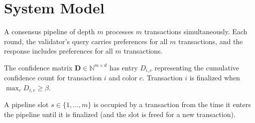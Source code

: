 \section{System Model}

\label{sec:model}

\begin{definition}[Pipeline]
A consensus pipeline of depth $m$ processes $m$ transactions simultaneously. Each
round, the validator's query carries preferences for all $m$ transactions, and the
response includes preferences for all $m$ transactions.
\end{definition}

\begin{definition}
The confidence matrix $\mathbf{D} \in \mathbb{N}^{m \times d}$ has entry $D_{i,c}$
representing the cumulative confidence count for transaction $i$ and color $c$.
Transaction $i$ is finalized when $\max_c D_{i,c} \geq \beta$.
\end{definition}

\begin{definition}
A pipeline slot $s \in \{1, \ldots, m\}$ is occupied by a transaction from the time
it enters the pipeline until it is finalized (and the slot is freed for a new transaction).
\end{definition}

